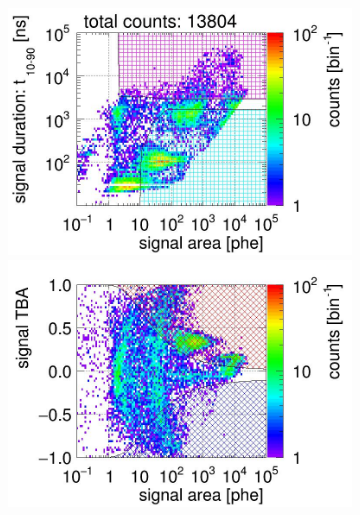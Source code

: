 \begin{landscape}%
	\begin{figure}[!p]
		\centering
		\begin{subfigure}[t]{0.33\textwidth} %
			\centering
			\includegraphics[width=\figurewidth,clip,trim={0 98 0 0}]{Figures/GasTest/CutsValid/res64766/pdpa22Vecfig64766.jpg}
			\includegraphics[width=\figurewidth,clip,trim={0 0 0 40}]{Figures/GasTest/CutsValid/res64766/tbapa22Vecfig64766.jpg}
			\caption{}
			\label{fig:signal selection dv 10 01}
		\end{subfigure}
		\begin{subfigure}[t]{0.33\textwidth}
			\centering

\end{subfigure}
\end{figure}
\end{landscape}
